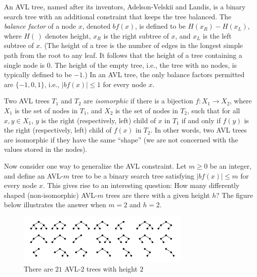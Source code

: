 

An AVL tree, named after its inventors, Adelson-Velskii and Landis, is a binary search tree
with an additional constraint that keeps the tree balanced. The \emph{balance factor} of
a node $x$, denoted $\mathit{bf}(x)$, is defined to be $H(x_R) - H(x_L)$, where $H(\,)$
denotes height, $x_R$ is the right subtree of $x$, and $x_L$ is the left subtree of $x$.
(The height of a tree is the number of edges in the longest simple path from the root
to any leaf. It follows that the height of a tree containing a single node is $0$.
The height of the empty tree, i.e., the tree with no nodes, is typically defined to be $-1$.)
In an AVL tree, the only balance factors permitted are $\{-1,0,1\}$, i.e., $|\mathit{bf}(x)| \leq 1$
for every node $x$.

Two AVL trees $T_1$ and $T_2$ are \emph{isomorphic} if there is a bijection
$f : X_1 \rightarrow X_2$, where $X_1$ is the set of nodes in $T_1$, and $X_2$ is the set
of nodes in $T_2$, such that for all $x,y \in X_1$, $y$ is the right (respectively, left) child
of $x$ in $T_1$ if and only if $f(y)$ is the right (respectively, left) child of $f(x)$ in $T_2$.
In other words, two AVL trees are isomorphic if they have the same ``shape''
(we are not concerned with the values stored in the nodes).

Now consider one way to generalize the AVL constraint. Let $m \geq 0$ be an integer, and
define an \mbox{AVL-$m$} tree to be a binary search tree satisfying $|\mathit{bf}(x)| \leq m$
for every node $x$. This gives rise to an interesting question: How many differently shaped
(non-isomorphic) \mbox{AVL-$m$} trees are there with a given height $h$? The figure below
illustrates the answer when $m=2$ and $h=2$.

\begin{figure}[!h]
\centering
\includegraphics[width=0.75\textwidth]{trees.png}
\caption{There are $21$ \mbox{AVL-$2$} trees with height $2$}
\end{figure}



